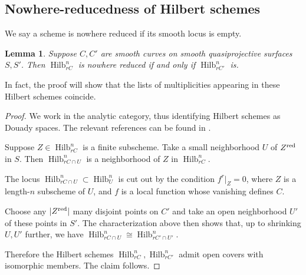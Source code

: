 \documentclass{amsart}
\theoremstyle{plain}
\newtheorem{lemma}[theorem]{Lemma}
\theoremstyle{definition}
\theoremstyle{remark}
\begin{document}
\subsection{Nowhere-reducedness of Hilbert schemes}
We say a scheme is nowhere reduced if its smooth locus is empty.
\begin{lemma}\label{lem:hilbetale}
    Suppose $C,C'$ are smooth curves on smooth quasiprojective surfaces $S,S'$.
    Then $\operatorname{Hilb}^n_{rC}$ is nowhere reduced if and only if $\operatorname{Hilb}^n_{rC'}$ is.
\end{lemma}
In fact, the proof will show that the lists of multiplicities appearing in these Hilbert schemes coincide.
\begin{proof}
    We work in the analytic category, thus identifying Hilbert schemes as Douady spaces.
    The relevant references can be found in \cite{dCM_douady}.

    Suppose $Z\in\operatorname{Hilb}_{rC}^n$ is a finite subscheme.
    Take a small neighborhood $U$ of $Z^{\rm red}$ in $S$.
    Then $\operatorname{Hilb}_{rC\cap U}^n$ is a neighborhood of $Z$ in $\operatorname{Hilb}_{rC}^n$.

    The locus $\operatorname{Hilb}_{rC\cap U}^n\subset\operatorname{Hilb}_U^n$ is cut out by the condition $f^r|_Z=0$, where $Z$ is a length-$n$ subscheme of $U$, and $f$ is a local function whose vanishing defines $C$.

    Choose any $|Z^{\rm red}|$ many disjoint points on $C'$ and take an open neighborhood $U'$ of these points in $S'$.
    The characterization above then shows that, up to shrinking $U,U'$ further, we have $\operatorname{Hilb}_{rC\cap U}^n\cong\operatorname{Hilb}_{rC'\cap U'}^n$.

    Therefore the Hilbert schemes $\operatorname{Hilb}^n_{rC},\operatorname{Hilb}^n_{rC'}$ admit open covers with isomorphic members.
    The claim follows.
\end{proof}
\end{document}
